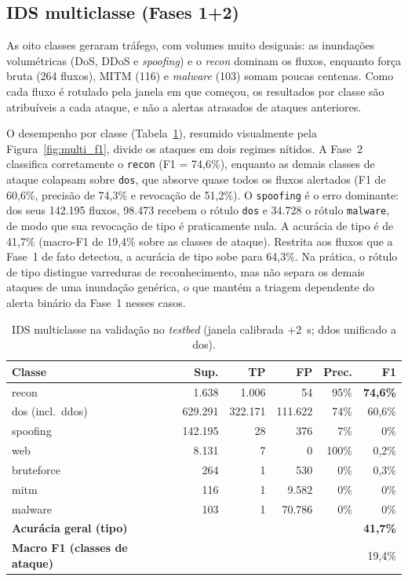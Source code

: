 \documentclass[12pt,a4paper]{article}
\begin{document}
\subsection{IDS multiclasse (Fases 1+2)}
\label{subsec:res_multi}

As oito classes geraram tráfego, com volumes muito desiguais: as inundações
volumétricas (DoS, DDoS e \textit{spoofing}) e o \textit{recon} dominam os fluxos,
enquanto força bruta (264 fluxos), MITM (116) e \textit{malware} (103) somam poucas
centenas. Como cada fluxo é rotulado pela janela em que começou, os resultados por
classe são atribuíveis a cada ataque, e não a alertas atrasados de ataques
anteriores.

O desempenho por classe (Tabela~\ref{tab:multi_metrics}), resumido visualmente
pela Figura~\ref{fig:multi_f1}, divide os ataques em dois regimes nítidos. A
Fase~2 classifica corretamente o \texttt{recon} (F1 = 74,6\%), enquanto as demais
classes de ataque colapsam sobre \texttt{dos}, que absorve quase todos os fluxos
alertados (F1 de 60,6\%, precisão de 74,3\% e revocação de 51,2\%). O
\texttt{spoofing} é o erro dominante: dos seus 142.195 fluxos, 98.473 recebem o
rótulo \texttt{dos} e 34.728 o rótulo \texttt{malware}, de modo que sua revocação
de tipo é praticamente nula. A acurácia de tipo é de 41,7\% (macro-F1 de 19,4\%
sobre as classes de ataque). Restrita aos fluxos que a Fase~1 de fato detectou, a
acurácia de tipo sobe para 64,3\%. Na prática, o rótulo de tipo distingue
varreduras de reconhecimento, mas não separa os demais ataques de uma inundação
genérica, o que mantém a triagem dependente do alerta binário da Fase~1 nesses
casos.

\begin{table}[ht]
\centering
\caption{IDS multiclasse na validação no \textit{testbed} (janela calibrada
$+2$~s; ddos unificado a dos).}
\label{tab:multi_metrics}
\begin{tabular}{@{}lrrrrr@{}}
\toprule
\textbf{Classe} & \textbf{Sup.} & \textbf{TP} & \textbf{FP} & \textbf{Prec.} & \textbf{F1} \\ \midrule
recon             &   1.638 &   1.006 &       54 & 95\% & \textbf{74,6\%} \\
dos (incl.\ ddos) & 629.291 & 322.171 & 111.622 & 74\% & 60,6\% \\
spoofing          & 142.195 &      28 &      376 &  7\% & 0\% \\
web               &   8.131 &       7 &        0 & 100\% & 0,2\% \\
bruteforce        &     264 &       1 &      530 &  0\% & 0,3\% \\
mitm              &     116 &       1 &    9.582 &  0\% & 0\% \\
malware           &     103 &       1 &   70.786 &  0\% & 0\% \\ \midrule
\textbf{Acurácia geral (tipo)} & \multicolumn{5}{r}{\textbf{41,7\%}} \\
\textbf{Macro F1 (classes de ataque)} & \multicolumn{5}{r}{19,4\%} \\
\bottomrule
\end{tabular}
\end{table}
\end{document}
